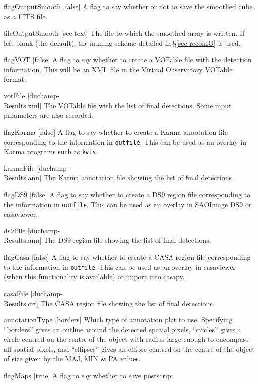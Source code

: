 \begin{Lentry}
\item[{flagOutputSmooth [false]}] A flag to say whether or not
  to save the smoothed cube as a FITS file. 
\item[fileOutputSmooth{ [see text]}] The file to which the smoothed array
  is written. If left blank (the default), the naming scheme detailed
  in \S\ref{sec-reconIO} is used.
\item[{flagVOT [false]}] A flag to say whether to create a
  VOTable file with the detection information. This will be an XML
  file in the Virtual Observatory VOTable format.
\item[{votFile [duchamp-\\Results.xml]}] The VOTable file with
  the list of final detections. Some input parameters are also
  recorded. 
\item[{flagKarma [false]}] A flag to say whether to create a
  Karma annotation file corresponding to the information in
  \texttt{outfile}. This can be used as an overlay in Karma
  programs such as \texttt{kvis}.
\item[{karmaFile [duchamp-\\Results.ann]}] The Karma annotation
  file showing the list of final detections.
\item[{flagDS9 [false]}] A flag to say whether to create a
  DS9 region file corresponding to the information in
  \texttt{outfile}. This can be used as an overlay in SAOImage DS9 or
  casaviewer. 
\item[{ds9File [duchamp-\\Results.ann]}] The DS9 region file showing
  the list of final detections.
\item[{flagCasa [false]}] A flag to say whether to create a
  CASA region file corresponding to the information in
  \texttt{outfile}. This can be used as an overlay in casaviewer (when
  this functionality is available) or import into casapy. 
\item[{casaFile [duchamp-\\Results.crf]}] The CASA region file showing
  the list of final detections.
\item[{annotationType [borders]}] Which type of annotation plot to
  use. Specifying ``borders'' gives an outline around the detected
  spatial pixels, ``circles'' gives a circle centred on the
  centre of the object with radius large enough to encompass all
  spatial pixels, and ``ellipses'' gives an ellipse centred on the
  centre of the object of size given by the MAJ, MIN \& PA values. 
\item[{flagMaps [true]}] A flag to say whether to save postscript

\end{Lentry}
